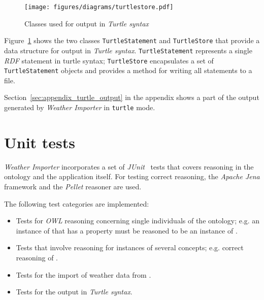 \begin{figure}
\centering
\texttt{[image: figures/diagrams/turtlestore.pdf]}
\caption{Classes used for output in \emph{Turtle syntax}}
\label{fig:importer_turtlestore}
\end{figure}

Figure~\ref{fig:importer_turtlestore} shows the two classes \texttt{TurtleStatement} and \texttt{TurtleStore} that provide a data structure for output in \emph{Turtle syntax}. \texttt{TurtleStatement} represents a single \emph{RDF} statement in turtle syntax; \texttt{TurtleStore} encapsulates a set of \texttt{TurtleStatement} objects and provides a method for writing all statements to a file.

Section~\ref{sec:appendix_turtle_output} in the appendix shows a part of the output generated by \emph{Weather Importer} in \texttt{turtle} mode.

\section{Unit tests}
\label{sec:importer_tests}

\emph{Weather Importer} incorporates a set of \emph{JUnit}~\cite{junit} tests that covers reasoning in the \smarthomeweather ontology and the application itself. For testing correct reasoning, the \emph{Apache Jena} framework and the \emph{Pellet} reasoner are used.

The following test categories are implemented:
\begin{itemize}
  \item Tests for \emph{OWL} reasoning concerning single individuals of the ontology; e.g. an instance of  that has a  property must be reasoned to be an instance of .
  \item Tests that involve reasoning for instances of several concepts; e.g. correct reasoning of .
  \item Tests for the import of weather data from \yrno.
  \item Tests for the output in \emph{Turtle syntax}.
\end{itemize}

\begin{comment}
The following parts of the application are not covered by unit tests:

\begin{itemize}
  \item bla
  \item blubb
  \item foo
  \item bar
\end{itemize}
\end{comment}
